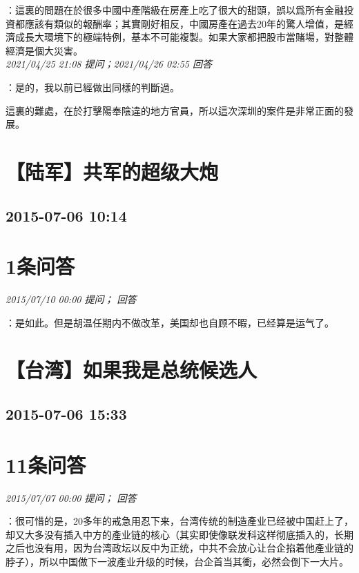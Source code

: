 \documentclass[twocolumn]{ctexart}
\begin{document}
：這裏的問題在於很多中國中產階級在房產上吃了很大的甜頭，誤以爲所有金融投資都應該有類似的報酬率；其實剛好相反，中國房產在過去20年的驚人增值，是經濟成長大環境下的極端特例，基本不可能複製。如果大家都把股市當賭場，對整體經濟是個大災害。
\\

\textit{\hfill\noindent\small 2021/04/25 21:08 提问；2021/04/26 02:55 回答}

：是的，我以前已經做出同樣的判斷過。

這裏的難處，在於打擊陽奉陰違的地方官員，所以這次深圳的案件是非常正面的發展。
\\


\section{【陆军】共军的超级大炮}
\subsection{2015-07-06 10:14}


\section{1条问答}

\textit{\hfill\noindent\small 2015/07/10 00:00 提问； 回答}

：是如此。但是胡温任期内不做改革，美国却也自顾不暇，已经算是运气了。\\


\section{【台湾】如果我是总统候选人 }
\subsection{2015-07-06 15:33}


\section{11条问答}

\textit{\hfill\noindent\small 2015/07/07 00:00 提问； 回答}

：很可惜的是，20多年的戒急用忍下来，台湾传统的制造產业已经被中国赶上了，却又大多没有插入中方的產业链的核心（其实即使像联发科这样彻底插入的，长期之后也没有用，因为台湾政坛以反中为正统，中共不会放心让台企掐着他產业链的脖子），所以中国做下一波產业升级的时候，台企首当其衝，必然会倒下一大片。
\end{document}
